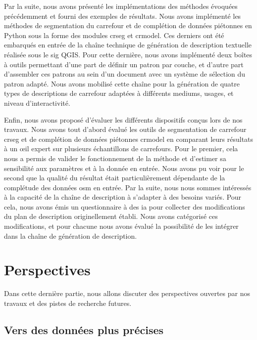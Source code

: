 Par la suite, nous avons présenté les implémentations des méthodes évoquées précédemment et fourni des exemples de résultats. Nous avons implémenté les méthodes de segmentation du carrefour et de complétion de données piétonnes en Python sous la forme des modules crseg et crmodel. Ces derniers ont été embarqués en entrée de la chaîne technique de génération de description textuelle réalisée sous le \gls{sig} QGIS. Pour cette dernière, nous avons implémenté deux boîtes à outils permettant d'une part de définir un patron par couche, et d'autre part d'assembler ces patrons au sein d'un document avec un système de sélection du patron adapté. Nous avons mobilisé cette chaîne pour la génération de quatre types de descriptions de carrefour adaptées à différents mediums, usages, et niveau d'interactivité. 

\newpar{}

Enfin, nous avons proposé d'évaluer les différents dispositifs conçus lors de nos travaux. Nous avons tout d'abord évalué les outils de segmentation de carrefour crseg et de complétion de données piétonnes crmodel en comparant leurs résultats à un œil expert sur plusieurs échantillons de carrefours. Pour le premier, cela nous a permis de valider le fonctionnement de la méthode et d'estimer sa sensibilité aux paramètres et à la donnée en entrée. Nous avons pu voir pour le second que la qualité du résultat était particulièrement dépendante de la complétude des données \gls{osm} en entrée. Par la suite, nous nous sommes intéressés à la capacité de la chaîne de description à s'adapter à des besoins variés. Pour cela, nous avons émis un questionnaire à des \gls{ia} pour collecter des modifications du plan de description originellement établi. Nous avons catégorisé ces modifications, et pour chacune nous avons évalué la possibilité de les intégrer dans la chaîne de génération de description.

\section{Perspectives}

Dans cette dernière partie, nous allons discuter des perspectives ouvertes par nos travaux et des pistes de recherche futures.

\subsection{Vers des données plus précises}

